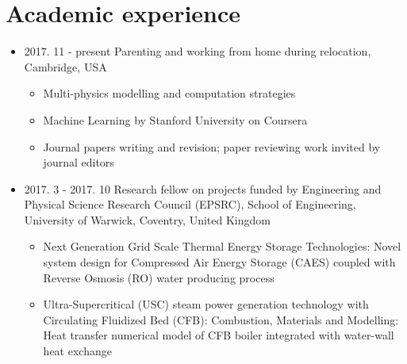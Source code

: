 \documentclass[letterpaper]{article}
\begin{document}
\section*{Academic experience}
\vspace{-10pt}
\begin{itemize}
\item 2017. 11 - present \hspace{2pt} Parenting and working from home during relocation, Cambridge, USA
		\begin{itemize}
		\item Multi-physics modelling and computation strategies
		\item Machine Learning by Stanford University on Coursera
		\item	Journal papers writing and revision; paper reviewing work invited by journal editors
		\end{itemize}		
\item 2017. 3 - 2017. 10  \hspace{2pt} Research fellow on projects funded by Engineering and Physical Science Research Council (EPSRC), School of Engineering, University of Warwick, Coventry, United Kingdom
		\begin{itemize}
		\item	Next Generation Grid Scale Thermal Energy Storage Technologies: Novel system design for Compressed Air Energy Storage (CAES) coupled with Reverse Osmosis (RO) water producing process
		\item	Ultra-Supercritical (USC) steam power generation technology with Circulating Fluidized Bed (CFB): Combustion, Materials and Modelling: Heat transfer numerical model of CFB boiler integrated with water-wall heat exchange
		\end{itemize}


\end{itemize}
\end{document}
